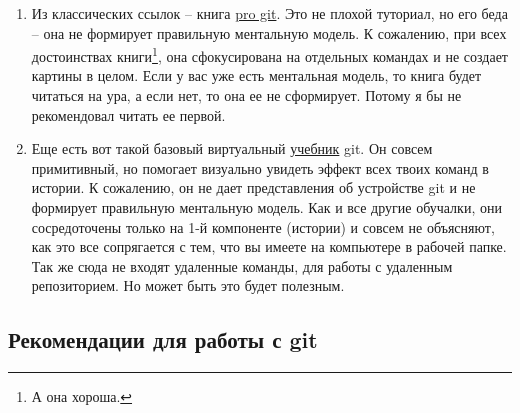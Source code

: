 \documentclass{article}
\begin{document}
\begin{enumerate}
\item Из классических ссылок -- книга \href{https://git-scm.com/book/en/v2}{pro git}. Это не плохой туториал, но его беда -- она не формирует правильную ментальную модель. К сожалению, при всех достоинствах книги\footnote{А она хороша.}, она сфокусирована на отдельных командах и не создает картины в целом. Если у вас уже есть ментальная модель, то книга будет читаться на ура, а если нет, то она ее не сформирует. Потому я бы не рекомендовал читать ее первой.

\item Еще есть вот такой базовый виртуальный \href{https://learngitbranching.js.org/ }{учебник} git. Он совсем примитивный, но помогает визуально увидеть эффект всех твоих команд в истории. К сожалению, он не дает представления об устройстве git и не формирует правильную ментальную модель. Как и все другие обучалки, они сосредоточены только на 1-й компоненте (истории) и совсем не объясняют, как это все сопрягается с тем, что вы имеете на компьютере в рабочей папке. Так же сюда не входят удаленные команды, для работы с удаленным репозиторием. Но может быть это будет полезным.

\end{enumerate}

\subsection{Рекомендации для работы с git}
\end{document}
